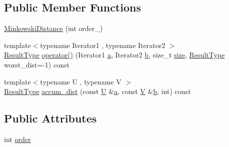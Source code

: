 \subsection*{Public Member Functions}
\begin{DoxyCompactItemize}
\item 
\hyperlink{structcvflann_1_1MinkowskiDistance_a47e723962a1c64dc6f488f6e2e481d29}{Minkowski\-Distance} (int order\-\_\-)
\item 
{\footnotesize template$<$typename Iterator1 , typename Iterator2 $>$ }\\\hyperlink{structcvflann_1_1MinkowskiDistance_a21baf56e06b45cdea5de1530c2e7c0ec}{Result\-Type} \hyperlink{structcvflann_1_1MinkowskiDistance_ac9ebfdd3f6bbf978ef88d68510828b75}{operator()} (Iterator1 \hyperlink{legacy_8hpp_a1031d0e0a97a340abfe0a6ab9e831045}{a}, Iterator2 \hyperlink{legacy_8hpp_ac04272e8ca865b8fba18d36edae9fd2a}{b}, size\-\_\-t \hyperlink{legacy_8hpp_ae97003f8d5c64cdfb99f6f2606d121b6}{size}, \hyperlink{structcvflann_1_1MinkowskiDistance_a21baf56e06b45cdea5de1530c2e7c0ec}{Result\-Type} worst\-\_\-dist=-\/1) const 
\item 
{\footnotesize template$<$typename U , typename V $>$ }\\\hyperlink{structcvflann_1_1MinkowskiDistance_a21baf56e06b45cdea5de1530c2e7c0ec}{Result\-Type} \hyperlink{structcvflann_1_1MinkowskiDistance_a548c7c4e8edf95dd3484463fc675a8a9}{accum\-\_\-dist} (const \hyperlink{core__c_8h_aa9c521f41af9a5191e5e4b6ffbae211a}{U} \&\hyperlink{legacy_8hpp_a1031d0e0a97a340abfe0a6ab9e831045}{a}, const \hyperlink{core__c_8h_ad8dd4fff0e3910932187b6de0543cae1}{V} \&\hyperlink{legacy_8hpp_ac04272e8ca865b8fba18d36edae9fd2a}{b}, int) const 
\end{DoxyCompactItemize}
\subsection*{Public Attributes}
\begin{DoxyCompactItemize}
\item 
int \hyperlink{structcvflann_1_1MinkowskiDistance_a2703b6de832914cac0163cab19803759}{order}
\end{DoxyCompactItemize}



